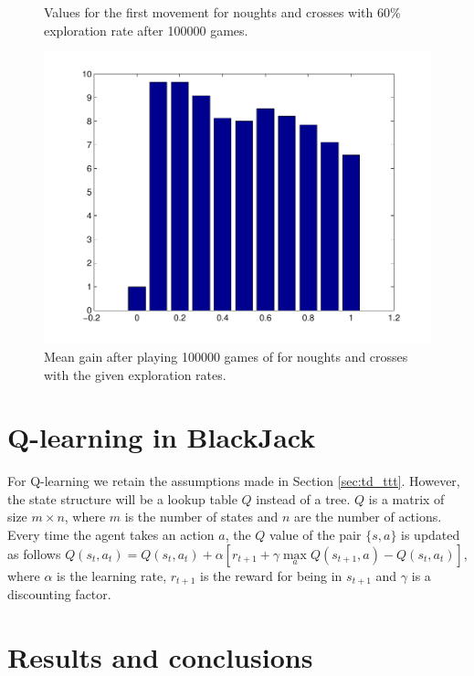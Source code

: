 \documentclass[12pt]{article}
\begin{document}
\begin{figure}[htbp!]
\begin{minipage}[t]{0.5\linewidth}
	\caption{Values for the first movement for noughts and crosses with 60\% exploration rate after 100000 games.}
	\label{fig:ttt_eps_0_6}
\end{minipage} 
\quad
\begin{minipage}[t]{0.45\linewidth}
	\includegraphics[scale=0.40]{images/tttExpectedGain}
	\caption{Mean gain after playing 100000 games of for noughts and crosses with the given exploration rates.}
	\label{fig:tttExpectedGain}
\end{minipage}
\end{figure}

\section{Q-learning in BlackJack}

For Q-learning we retain the assumptions made in Section \ref{sec:td_ttt}.
However, the state structure will be a lookup table $Q$ instead of a tree.
$Q$ is a matrix of size $m \times n$, where $m$ is the number of states and $n$ are the number of actions.
Every time the agent takes an action $a$, the $Q$ value of the pair $\lbrace s, a \rbrace$ is updated as follows $Q(s_t,a_t) = Q(s_t,a_t) + \alpha \left[ r_{t+1} + \gamma \max\limits_a Q(s_{t+1},a) - Q(s_t,a_t) \right]$, where $\alpha$ is the learning rate, $r_{t+1}$ is the reward for being in $s_{t+1}$ and $\gamma$ is a discounting factor.

\section{Results and conclusions}

%
%
\end{document}
